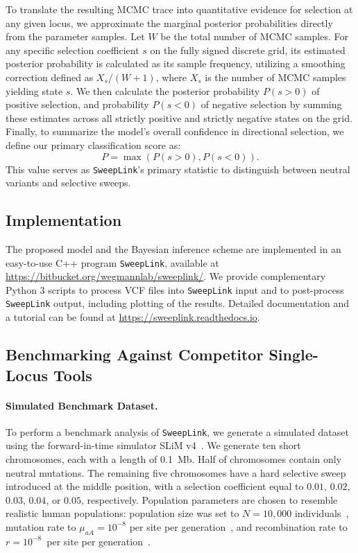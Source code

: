 \documentclass{article}
\newcommand{\SweepLink}{\texttt{SweepLink}\xspace}
\begin{document}
To translate the resulting MCMC trace into quantitative evidence for selection at any given locus, we approximate the marginal posterior probabilities directly from the parameter samples. 
Let $W$ be the total number of MCMC samples. 
For any specific selection coefficient $s$ on the fully signed discrete grid, its estimated posterior probability is calculated as its sample frequency, utilizing a smoothing correction defined as $ X_s / (W + 1) $, where $ X_s $ is the number of MCMC samples yielding state $ s $.
We then calculate the posterior probability $P(s > 0)$ of positive selection, and probability $P(s < 0)$ of negative selection by summing these estimates across all strictly positive and strictly negative states on the grid.
Finally, to summarize the model's overall confidence in directional selection, we define our primary classification score as:
\begin{equation}\label{eq:final_posterior}
    P = \max(P(s > 0), P(s < 0)).
\end{equation}
This value serves as \SweepLink’s primary statistic to distinguish between neutral variants and selective sweeps.

\subsection{Implementation}

The proposed model and the Bayesian inference scheme are implemented in an easy-to-use C++ program \SweepLink, available at \url{https://bitbucket.org/wegmannlab/sweeplink/}.
We provide complementary Python 3 scripts to process VCF files into \SweepLink input and to post-process \SweepLink output, including plotting of the results.
Detailed documentation and a tutorial can be found at \url{https://sweeplink.readthedocs.io}.

\subsection{Benchmarking Against Competitor Single-Locus Tools}

\paragraph{Simulated Benchmark Dataset.}
To perform a benchmark analysis of \SweepLink, we generate a simulated dataset using the forward-in-time simulator SLiM v4~\citep{haller2023}.
We generate ten short chromosomes, each with a length of 0.1~Mb.
Half of chromosomes contain only neutral mutations.
The remaining five chromosomes have a hard selective sweep introduced at the middle position, with a selection coefficient equal to $0.01$, $0.02$, $0.03$, $0.04$, or $0.05$, respectively.
Population parameters are chosen to resemble realistic human populations: population size was set to $N=10{,}000$ individuals~\citep{takahata1993}, mutation rate to $\mu_{aA} = 10^{-8}$ per site per generation~\citep{kong2012}, and recombination rate to $r=10^{-8}$~per site per generation~\citep{kong2002}.
\end{document}
